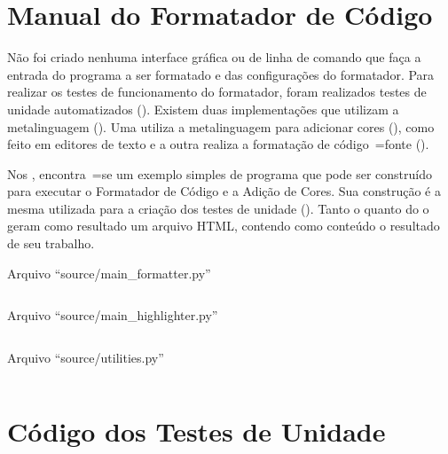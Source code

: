 

\chapter{Manual do Formatador de Código}
\label{manualDoFormatadorDeCodigo}

Não foi criado nenhuma interface gráfica ou
de linha de comando que faça a entrada do programa a ser formatado e
das configurações do formatador.
Para realizar os testes de funcionamento do formatador,
foram realizados testes de unidade automatizados ().
Existem duas implementações que utilizam a metalinguagem ().
Uma utiliza a metalinguagem para adicionar cores (),
como feito em editores de texto e
a outra realiza a formatação de código~=fonte ().

Nos ,
encontra~=se um exemplo simples de programa que pode ser construído para executar o Formatador de Código e
a Adição de Cores.
Sua construção é a mesma utilizada para a criação dos testes de unidade ().
Tanto o  quanto do o  geram como resultado um arquivo HTML,
contendo como conteúdo o resultado de seu trabalho.
\begin{code}
\caption{Arquivo ``source/main\_formatter.py''}
\label{mainHighlighterPy}
\inputminted[fontsize=\small,linenos=true,numberblanklines=true,breaklines=true]{python3}{../source/main_formatter.py}
\end{code}
\begin{code}
\caption{Arquivo ``source/main\_highlighter.py''}
\label{mainFormatterPy}
\inputminted[fontsize=\small,linenos=true,numberblanklines=true,breaklines=true]{python3}{../source/main_formatter.py}
\end{code}
\begin{code}
\caption{Arquivo ``source/utilities.py''}
\label{utilitiesPy}
\inputminted[fontsize=\small,linenos=true,numberblanklines=true,breaklines=true]{python3}{../source/utilities.py}
\end{code}


\chapter{Código dos Testes de Unidade}

